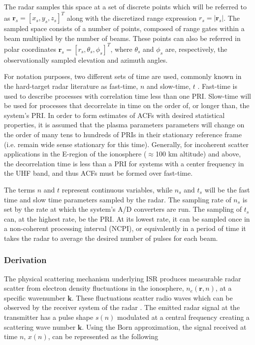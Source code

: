 The radar samples this space at a set of discrete points which will be referred to as $\mathbf{r}_s = [x_s,y_s,z_s]^T$ along with the discretized range expression $r_s=|\mathbf{r}_s|$. The sampled space consists of a number of points, composed of range gates within a beam multiplied by the number of beams. These points can also be referred in polar coordinates $\mathbf{r}_s = [r_s,\theta_s,\phi_s]^T$, where $\theta_s$  and $\phi_s$ are, respectively, the observationally sampled elevation and azimuth angles.

For notation purposes, two different sets of time are used, commonly known in the hard-target radar literature as fast-time, $n$ and slow-time, $t$ \cite{richards:fundamentalsigproc}. Fast-time is used to describe processes with correlation time less than one PRI. Slow-time will be used for processes that decorrelate in time on the order of, or longer than, the system's PRI. In order to form estimates of ACFs with desired statistical properties, it is assumed that the plasma parameters parameters will change on the order of many tens to hundreds of PRIs in their stationary reference frame (i.e. remain wide sense stationary for this time). Generally, for incoherent scatter applications in the E-region of the ionosphere ($\approx$100 km altitude) and above, the decorrelation time is less than a PRI for systems with a center frequency in the UHF band, and thus ACFs must be formed over fast-time.

The terms $n$ and $t$ represent continuous variables, while $n_s$ and $t_s$ will be the fast time and slow time parameters sampled by the radar. The sampling rate of $n_s$ is set by the rate at which the system's A/D converters are run. The sampling of $t_s$ can, at the highest rate, be the PRI. At its lowest rate, it can be sampled once in a non-coherent processing interval (NCPI), or equivalently in a period of time it takes the radar to average the desired number of pulses for each beam. 

\subsubsection{Derivation}

The physical scattering mechanism underlying ISR produces measurable radar scatter from electron density fluctuations in the ionosphere, $n_e(\mathbf{r},n)$, at a specific wavenumber $\mathbf{k}$. These fluctuations scatter radio waves which can be observed by the receiver system of the radar \cite{dougherty:farley1960}. The emitted radar signal at the transmitter has a pulse shape $s(n)$ modulated at a central frequency creating a scattering wave number $\mathbf{k}$. Using the Born approximation, the signal received at time $n$, $x(n)$, can be represented as the following

